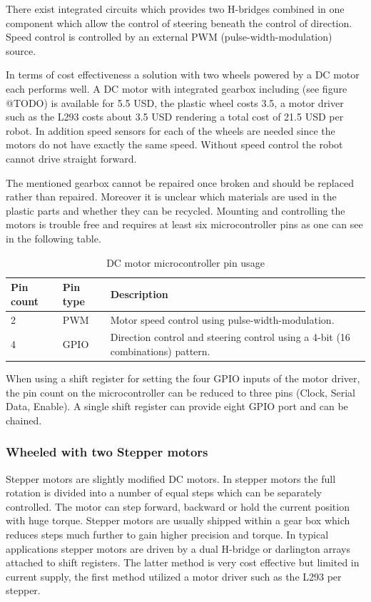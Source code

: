 \documentclass[11pt,a4paper]{article}
\begin{document}
There exist integrated circuits which provides two H-bridges combined in one component which allow the control of steering beneath the control of direction. Speed control is controlled by an external PWM (pulse-width-modulation) source.


In terms of cost effectiveness a solution with two wheels powered by a DC motor each performs well. A DC motor with integrated gearbox including (see figure @TODO) is available for 5.5 USD, the plastic wheel costs 3.5, a motor driver such as the L293 costs about 3.5 USD rendering a total cost of 21.5 USD per robot. In addition speed sensors for each of the wheels are needed since the motors do not have exactly the same speed. Without speed control the robot cannot drive straight forward.

The mentioned gearbox cannot be repaired once broken and should be replaced rather than repaired. Moreover it is unclear which materials are used in the plastic parts and whether they can be recycled. Mounting and controlling the motors is trouble free and requires at least six microcontroller pins as one can see in the following table.

\begin{table}[h!]
\centering
\begin{tabular}{p{}p{}p{}}
\toprule
Pin count & Pin type & Description \\
\midrule
2 & PWM  & Motor speed control using pulse-width-modulation.\\
4 & GPIO & Direction control and steering control using a 4-bit (16 combinations) pattern.\\
\bottomrule
\end{tabular}
\caption{DC motor microcontroller pin usage}
\label{tbl:dc_pin}
\end{table}

When using a shift register for setting the four GPIO inputs of the motor driver, the pin count on the microcontroller can be reduced to three pins (Clock, Serial Data, Enable).  A single shift register can provide eight GPIO port and can be chained.


\subsubsection{Wheeled with two Stepper motors}
Stepper motors are slightly modified DC motors. In stepper motors the full rotation is divided into a number of equal steps which can be separately controlled. The motor can step forward, backward or hold the current position with huge torque. Stepper motors are usually shipped within a gear box which reduces steps much further to gain higher precision and torque. 
In typical applications stepper motors are driven by a dual H-bridge or darlington arrays attached to shift registers. The latter method is very cost effective but limited in current supply, the first method utilized a motor driver such as the L293 per stepper.
\end{document}
